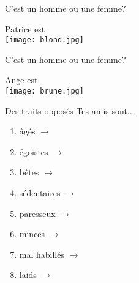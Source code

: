 \documentclass{beamer}
\begin{document}
  \begin{frame}{C'est un homme ou une femme?}
    \begin{center}
      Patrice est \underline{} \\
      \texttt{[image: blond.jpg]}
    \end{center}
  \end{frame}

  \begin{frame}{C'est un homme ou une femme?}
    \begin{center}
      Ange est \underline{} \\
      \texttt{[image: brune.jpg]}
    \end{center}
  \end{frame}

  \begin{frame}{Des traits opposés}
    Tes amis sont...
    \begin{enumerate}
      \item âgés $\to$ \underline{}
      \item égoïstes $\to$ \underline{}
      \item bêtes $\to$ \underline{}
      \item sédentaires $\to$ \underline{}
      \item paresseux $\to$ \underline{}
      \item minces $\to$ \underline{}
      \item mal habillés $\to$ \underline{}
      \item laids $\to$ \underline{}
    \end{enumerate}
  \end{frame}
\end{document}
